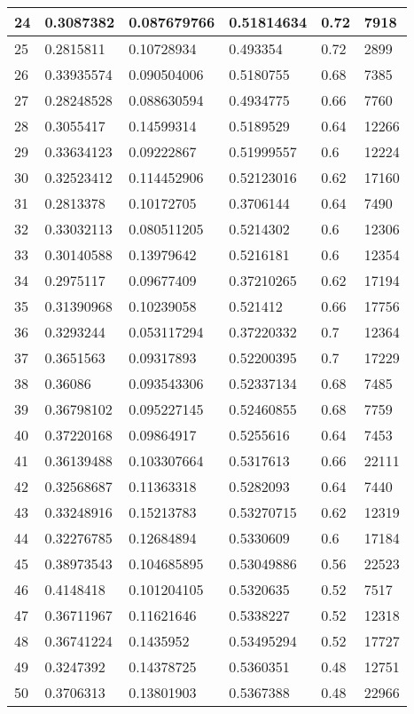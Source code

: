 \begin{longtable}{|l|l|l|l|l|l|}
24 & 0.3087382 & 0.087679766 & 0.51814634 & 0.72 & 7918 \\ \hline 
25 & 0.2815811 & 0.10728934 & 0.493354 & 0.72 & 2899 \\ \hline 
26 & 0.33935574 & 0.090504006 & 0.5180755 & 0.68 & 7385 \\ \hline 
27 & 0.28248528 & 0.088630594 & 0.4934775 & 0.66 & 7760 \\ \hline 
28 & 0.3055417 & 0.14599314 & 0.5189529 & 0.64 & 12266 \\ \hline 
29 & 0.33634123 & 0.09222867 & 0.51999557 & 0.6 & 12224 \\ \hline 
30 & 0.32523412 & 0.114452906 & 0.52123016 & 0.62 & 17160 \\ \hline 
31 & 0.2813378 & 0.10172705 & 0.3706144 & 0.64 & 7490 \\ \hline 
32 & 0.33032113 & 0.080511205 & 0.5214302 & 0.6 & 12306 \\ \hline 
33 & 0.30140588 & 0.13979642 & 0.5216181 & 0.6 & 12354 \\ \hline 
34 & 0.2975117 & 0.09677409 & 0.37210265 & 0.62 & 17194 \\ \hline 
35 & 0.31390968 & 0.10239058 & 0.521412 & 0.66 & 17756 \\ \hline 
36 & 0.3293244 & 0.053117294 & 0.37220332 & 0.7 & 12364 \\ \hline 
37 & 0.3651563 & 0.09317893 & 0.52200395 & 0.7 & 17229 \\ \hline 
38 & 0.36086 & 0.093543306 & 0.52337134 & 0.68 & 7485 \\ \hline 
39 & 0.36798102 & 0.095227145 & 0.52460855 & 0.68 & 7759 \\ \hline 
40 & 0.37220168 & 0.09864917 & 0.5255616 & 0.64 & 7453 \\ \hline 
41 & 0.36139488 & 0.103307664 & 0.5317613 & 0.66 & 22111 \\ \hline 
42 & 0.32568687 & 0.11363318 & 0.5282093 & 0.64 & 7440 \\ \hline 
43 & 0.33248916 & 0.15213783 & 0.53270715 & 0.62 & 12319 \\ \hline 
44 & 0.32276785 & 0.12684894 & 0.5330609 & 0.6 & 17184 \\ \hline 
45 & 0.38973543 & 0.104685895 & 0.53049886 & 0.56 & 22523 \\ \hline 
46 & 0.4148418 & 0.101204105 & 0.5320635 & 0.52 & 7517 \\ \hline 
47 & 0.36711967 & 0.11621646 & 0.5338227 & 0.52 & 12318 \\ \hline 
48 & 0.36741224 & 0.1435952 & 0.53495294 & 0.52 & 17727 \\ \hline 
49 & 0.3247392 & 0.14378725 & 0.5360351 & 0.48 & 12751 \\ \hline 
50 & 0.3706313 & 0.13801903 & 0.5367388 & 0.48 & 22966 \\ \hline 
\end{longtable}